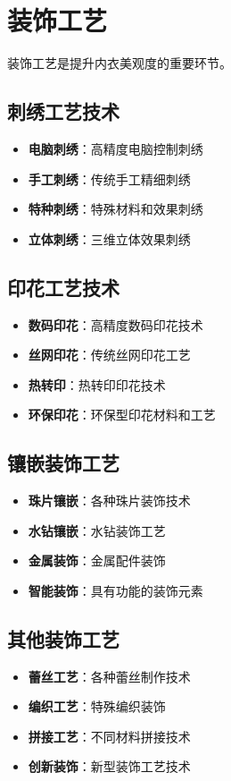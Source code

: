 \documentclass[12pt,UTF8]{ctexbook}
\begin{document}
\section{装饰工艺}
装饰工艺是提升内衣美观度的重要环节。

\subsection{刺绣工艺技术}
\begin{itemize}[leftmargin=2cm]
	\item \textbf{电脑刺绣}：高精度电脑控制刺绣
	\item \textbf{手工刺绣}：传统手工精细刺绣
	\item \textbf{特种刺绣}：特殊材料和效果刺绣
	\item \textbf{立体刺绣}：三维立体效果刺绣
\end{itemize}

\subsection{印花工艺技术}
\begin{itemize}[leftmargin=2cm]
	\item \textbf{数码印花}：高精度数码印花技术
	\item \textbf{丝网印花}：传统丝网印花工艺
	\item \textbf{热转印}：热转印印花技术
	\item \textbf{环保印花}：环保型印花材料和工艺
\end{itemize}

\subsection{镶嵌装饰工艺}
\begin{itemize}[leftmargin=2cm]
	\item \textbf{珠片镶嵌}：各种珠片装饰技术
	\item \textbf{水钻镶嵌}：水钻装饰工艺
	\item \textbf{金属装饰}：金属配件装饰
	\item \textbf{智能装饰}：具有功能的装饰元素
\end{itemize}

\subsection{其他装饰工艺}
\begin{itemize}[leftmargin=2cm]
	\item \textbf{蕾丝工艺}：各种蕾丝制作技术
	\item \textbf{编织工艺}：特殊编织装饰
	\item \textbf{拼接工艺}：不同材料拼接技术
	\item \textbf{创新装饰}：新型装饰工艺技术
\end{itemize}
\end{document}
